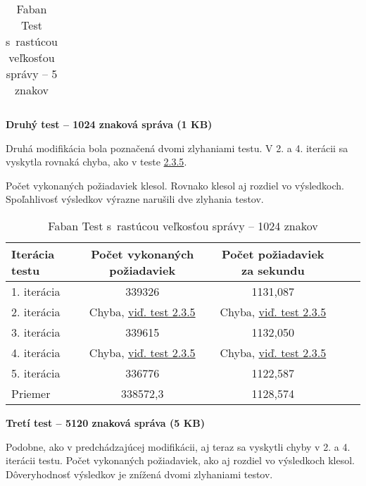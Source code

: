 \documentclass[12pt,oneside,final]{fithesis-utf8}
\begin{document}
\begin{itemize}
\begin{table}[H]
\begin{center}
\begin{tabular}{ | l | c | c | c | c |}
\end{tabular}
\end{center}
\caption{Faban Test s~rastúcou veľkosťou správy -- 5 znakov}
\end{table}


\textbf{Druhý test -- 1024 znaková správa (1 KB)}

Druhá modifikácia bola poznačená dvomi zlyhaniami testu. V 2. a 4. iterácii sa vyskytla rovnaká chyba, ako v teste \hyperlink{label}{2.3.5}.
\par Počet vykonaných požiadaviek klesol. Rovnako klesol aj rozdiel vo výsledkoch. Spoľahlivosť výsledkov výrazne narušili dve zlyhania testov.

\begin{table}[H]
\begin{center}
\begin{tabular}{ | l | c | c | c | c |}
		\hline
		 \textbf{Iterácia testu} & \textbf{Počet vykonaných požiadaviek} & \textbf{Počet požiadaviek za sekundu} \\ \hline
		 1. iterácia & 339326 & 1131,087 \\ \hline
		 2. iterácia & Chyba, \hyperlink{label}{viď. test 2.3.5} & Chyba, \hyperlink{label}{viď. test 2.3.5} \\ \hline
		 3. iterácia & 339615 & 1132,050 \\ \hline
		 4. iterácia & Chyba, \hyperlink{label}{viď. test 2.3.5} & Chyba, \hyperlink{label}{viď. test 2.3.5} \\ \hline
		 5. iterácia & 336776 & 1122,587 \\ \hline
		 Priemer & 338572,3 & 1128,574 \\ \hline
		 
\end{tabular}
\end{center}
\caption{Faban Test s~rastúcou veľkosťou správy -- 1024 znakov}
\end{table}


\textbf{Tretí test -- 5120 znaková správa (5 KB)}

Podobne, ako v predchádzajúcej modifikácii, aj teraz sa vyskytli chyby v 2. a 4. iterácii testu. Počet vykonaných požiadaviek, ako aj rozdiel vo výsledkoch klesol. Dôveryhodnosť výsledkov je znížená dvomi zlyhaniami testov.


\end{itemize}
\end{document}
